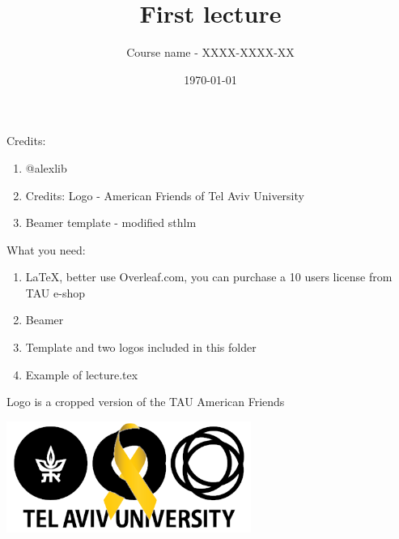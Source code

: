 \documentclass[12pt]{beamer}
\begin{document}
\title{First lecture}
\author{Course name - XXXX-XXXX-XX}
\date{\today}

\begin{frame}
\titlepage
\end{frame}


\begin{frame}{Credits:}

\begin{enumerate}
\item @alexlib 
\item Credits: Logo - American Friends of Tel Aviv University 
\item Beamer template - modified sthlm
\end{enumerate}
\end{frame}

\begin{frame}{What you need:}

\begin{enumerate}
\item LaTeX, better use Overleaf.com, you can purchase a 10 users license from TAU e-shop
\item Beamer 
\item Template and two logos included in this folder
\item Example of lecture.tex
\end{enumerate}

\end{frame}

\begin{frame}{Logo is a cropped version of the TAU American Friends}

\begin{center}\includegraphics[width=0.6\textwidth]{tau_bringthemhome_black_on_white.png}\end{center}
\end{frame}
\end{document}
